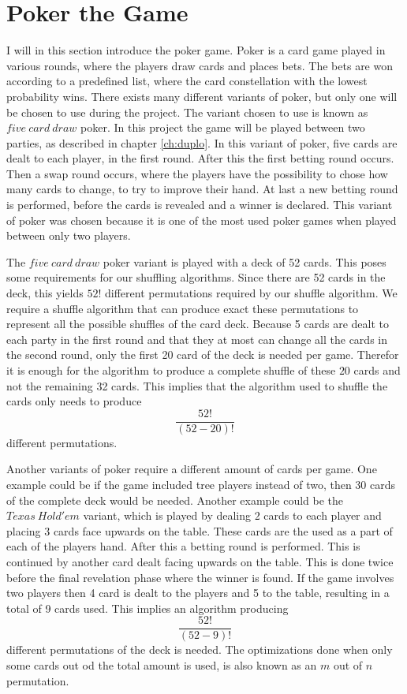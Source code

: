 \documentclass[twoside,11pt,openright]{report}
\begin{document}
\section{Poker the Game}
\label{sec:poker}
I will in this section introduce the poker game. Poker is a card game played in various rounds, where the players draw cards and places bets. The bets are won according to a predefined list, where the card constellation with the lowest probability wins. There exists many different variants of poker, but only one will be chosen to use during the project. The variant chosen to use is known as $five~card~draw$ poker. In this project the game will be played between two parties, as described in chapter \ref{ch:duplo}. In this variant of poker, five cards are dealt to each player, in the first round. After this the first betting round occurs. Then a swap round occurs, where the players have the possibility to chose how many cards to change, to try to improve their hand. At last a new betting round is performed, before the cards is revealed and a winner is declared. This variant of poker was chosen because it is one of the most used poker games when played between only two players.

The $five~card~draw$ poker variant is played with a deck of 52 cards. This poses some requirements for our shuffling algorithms. Since there are 52 cards in the deck, this yields $52!$ different permutations required by our shuffle algorithm. We require a shuffle algorithm that can produce exact these permutations to represent all the possible shuffles of the card deck. Because 5 cards are dealt to each party in the first round and that they at most can change all the cards in the second round, only the first 20 card of the deck is needed per game. Therefor it is enough for the algorithm to produce a complete shuffle of these $20$ cards and not the remaining 32 cards. This implies that the algorithm used to shuffle the cards only needs to produce $$\frac{52!}{(52-20)!}$$ different permutations. 

Another variants of poker require a different amount of cards per game. One example could be if the game included tree players instead of two, then 30 cards of the complete deck would be needed. Another example could be the $Texas~Hold'em$ variant, which is played by dealing $2$ cards to each player and placing $3$ cards face upwards on the table. These cards are the used as a part of each of the players hand. After this a betting round is performed. This is continued by another card dealt facing upwards on the table. This is done twice before the final revelation phase where the winner is found. If the game involves two players then 4 card is dealt to the players and 5 to the table, resulting in a total of 9 cards used. This implies an algorithm producing $$\frac{52!}{(52-9)!}$$ different permutations of the deck is needed. The optimizations done when only some cards out od the total amount is used, is also known as an $m$ out of $n$ permutation.
\end{document}
